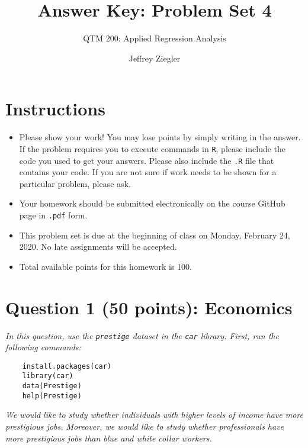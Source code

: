 \documentclass[12pt,letterpaper]{article}
\title{Answer Key: Problem Set 4}
\date{Jeffrey Ziegler}
\author{QTM 200: Applied Regression Analysis}
\begin{document}
	\maketitle
	
	\section*{Instructions}
	\begin{itemize}
		\item Please show your work! You may lose points by simply writing in the answer. If the problem requires you to execute commands in \texttt{R}, please include the code you used to get your answers. Please also include the \texttt{.R} file that contains your code. If you are not sure if work needs to be shown for a particular problem, please ask.
		\item Your homework should be submitted electronically on the course GitHub page in \texttt{.pdf} form.
		\item This problem set is due at the beginning of class on Monday, February 24, 2020. No late assignments will be accepted.
		\item Total available points for this homework is 100.
	\end{itemize}
	
		\vspace{.5cm}
	\section*{Question 1 (50 points): Economics}
	\vspace{.25cm}
	\noindent 	\textit{In this question, use the \texttt{prestige} dataset in the \texttt{car} library. First, run the following commands:}
	
	\begin{verbatim}
	install.packages(car)
	library(car)
	data(Prestige)
	help(Prestige)
	\end{verbatim} 
	
	
	\noindent \textit{We would like to study whether individuals with higher levels of income have more prestigious jobs. Moreover, we would like to study whether professionals have more prestigious jobs than blue and white collar workers.}
	
\end{document}
